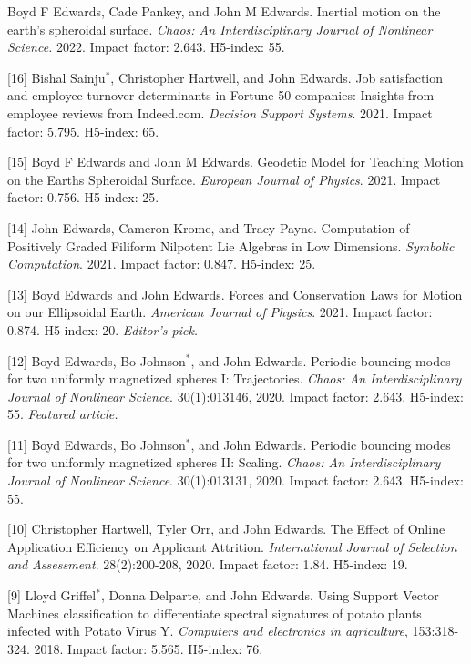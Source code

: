 \documentclass[margin,line]{res}
\newcommand{\pubunder}[1]{#1}
\newcommand{\jnum}[1]{[#1]}
\begin{document}
\begin{resume}
\jnum{17} Boyd F Edwards, Cade Pankey, and John M Edwards. Inertial motion on the earth’s spheroidal surface. \textit{Chaos: An Interdisciplinary Journal of Nonlinear Science.} 2022. Impact factor: 2.643. H5-index: 55.

\jnum{16} Bishal Sainju$^*$, Christopher Hartwell, and John Edwards. Job satisfaction and employee turnover determinants in Fortune 50 companies: Insights from employee reviews from Indeed.com. \textit{Decision Support Systems}. 2021. Impact factor: 5.795. H5-index: 65.

\jnum{15} Boyd F Edwards and John M Edwards. Geodetic Model for Teaching Motion on the Earths Spheroidal Surface. \textit{European Journal of Physics}. 2021. Impact factor: 0.756. H5-index: 25.

\jnum{14} John Edwards, Cameron Krome, and Tracy Payne. Computation of Positively Graded Filiform Nilpotent Lie Algebras in Low Dimensions. \textit{Symbolic Computation}. 2021. Impact factor: 0.847. H5-index: 25.

\jnum{13} Boyd Edwards and John Edwards. Forces and Conservation Laws for Motion on our Ellipsoidal Earth. \textit{American Journal of Physics}. 2021. Impact factor: 0.874. H5-index: 20. \textit{Editor's pick.}

\jnum{12} Boyd Edwards, Bo Johnson$^*$, and \pubunder{John Edwards}. Periodic bouncing modes for two uniformly magnetized spheres I: Trajectories. \textit{Chaos: An Interdisciplinary Journal of Nonlinear Science}. 30(1):013146, 2020. Impact factor: 2.643. H5-index: 55. \textit{Featured article.}

\jnum{11} Boyd Edwards, Bo Johnson$^*$, and \pubunder{John Edwards}. Periodic bouncing modes for two uniformly magnetized spheres II: Scaling. \textit{Chaos: An Interdisciplinary Journal of Nonlinear Science}. 30(1):013131, 2020. Impact factor: 2.643. H5-index: 55. 

\jnum{10} Christopher Hartwell, Tyler Orr, and \pubunder{John Edwards}. The Effect of Online Application Efficiency on Applicant Attrition. \textit{International Journal of Selection and Assessment}. 28(2):200-208, 2020. Impact factor: 1.84. H5-index: 19.

\jnum{9} Lloyd Griffel$^*$, Donna Delparte, and John Edwards. Using Support Vector Machines classification to differentiate spectral signatures of potato plants infected with Potato Virus Y. \textit{Computers and electronics in agriculture}, 153:318-324. 2018. Impact factor: 5.565. H5-index: 76.


\end{resume}
\end{document}
